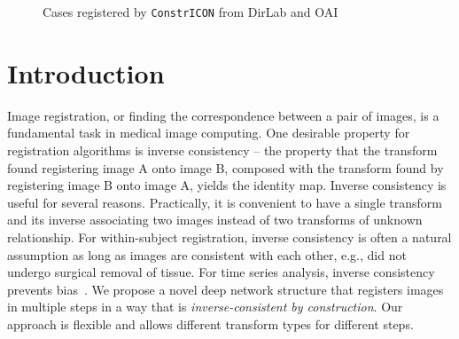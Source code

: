 \vspace{-2em}
\begin{figure}
	\caption{Cases registered by \texttt{ConstrICON} from DirLab and OAI}
	\label{fig:medical_sample}
	\vspace{-2em}
\end{figure}

\section{Introduction}
\label{sec:introduction}

Image registration, or finding the correspondence between a pair of images, is
a fundamental task in medical image computing. One desirable property for
registration algorithms is inverse consistency -- the property that the
transform found registering image A onto image B, composed with the transform
found by registering image B onto image A, yields the identity map. Inverse
consistency is useful for several reasons. Practically, it is convenient to
have a single transform and its inverse associating two images instead of two
transforms of unknown relationship. For within-subject registration, inverse
consistency is often a natural assumption as long as images are consistent
with each other, e.g., did not undergo surgical removal of tissue. For time
series analysis, inverse consistency prevents
bias~\cite{REUTER20101181}. We propose a novel deep network structure
that registers images in multiple steps in a way that is
\emph{inverse-consistent by construction}. Our approach is flexible and allows
different transform types for different steps.%

